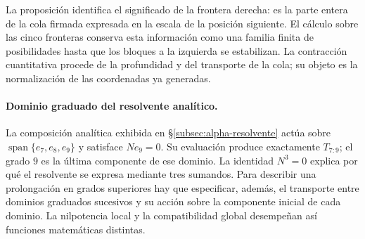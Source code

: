 La proposición identifica el significado de la frontera derecha: es la
parte entera de la cola firmada expresada en la escala de la posición
siguiente. El cálculo sobre las cinco fronteras conserva esta información
como una familia finita de posibilidades hasta que los bloques a la
izquierda se estabilizan. La contracción cuantitativa procede de la
profundidad y del transporte de la cola; su objeto es la normalización de
las coordenadas ya generadas.

\paragraph{Dominio graduado del resolvente analítico.}
\label{ampl-alfa-dominio-resolvente}
La composición analítica exhibida en
\S\ref{subsec:alpha-resolvente} actúa sobre
$\operatorname{span}\{e_7,e_8,e_9\}$ y satisface $Ne_9=0$. Su
evaluación produce exactamente $T_{7:9}$; el grado $9$ es la última
componente de ese dominio. La identidad $N^3=0$ explica por qué el
resolvente se expresa mediante tres sumandos. Para describir una
prolongación en grados superiores hay que especificar, además, el
transporte entre dominios graduados sucesivos y su acción sobre la
componente inicial de cada dominio. La nilpotencia local y la
compatibilidad global desempeñan así funciones matemáticas distintas.
